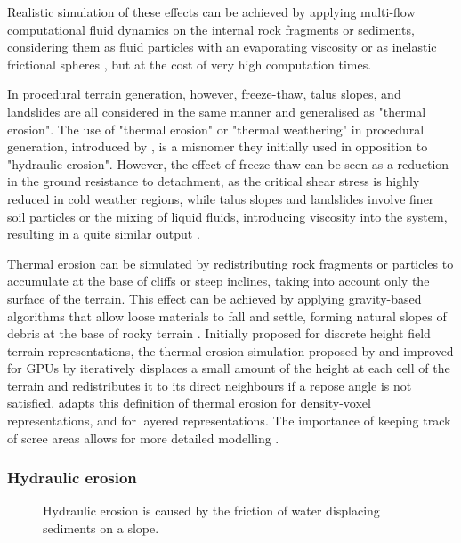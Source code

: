 \smallConclusion

Realistic simulation of these effects can be achieved by applying multi-flow computational fluid dynamics on the internal rock fragments or sediments, considering them as fluid particles with an evaporating viscosity \cite{Feng2024,Harmon2001,Lenaerts2009} or as inelastic frictional spheres \cite{Walton1993}, but at the cost of very high computation times.

In procedural terrain generation, however, freeze-thaw, talus slopes, and landslides are all considered in the same manner and generalised as "thermal erosion". The use of "thermal erosion" or "thermal weathering" in procedural generation, introduced by \cite{Musgrave1989}, is a misnomer they initially used in opposition to "hydraulic erosion". However, the effect of freeze-thaw can be seen as a reduction in the ground resistance to detachment, as the critical shear stress is highly reduced in cold weather regions, while talus slopes and landslides involve finer soil particles or the mixing of liquid fluids, introducing viscosity into the system, resulting in a quite similar output \cite{Hudak2011}.

Thermal erosion can be simulated by redistributing rock fragments or particles to accumulate at the base of cliffs or steep inclines, taking into account only the surface of the terrain. This effect can be achieved by applying gravity-based algorithms that allow loose materials to fall and settle, forming natural slopes of debris at the base of rocky terrain \cite{Musgrave1989,Jones2010}. Initially proposed for discrete height field terrain representations, the thermal erosion simulation proposed by \citep{Musgrave1989} and improved for GPUs by \cite{Jako2011} iteratively displaces a small amount of the height at each cell of the terrain and redistributes it to its direct neighbours if a repose angle is not satisfied. \citep{Jones2010} adapts this definition of thermal erosion for density-voxel representations, and \citep{Benes2001} for layered representations. The importance of keeping track of scree areas allows for more detailed modelling \cite{Peytavie2009a,Paris2020}.

\subsubsection{Hydraulic erosion}
\begin{figure}
    \centering
    \caption{Hydraulic erosion is caused by the friction of water displacing sediments on a slope.}
    \label{fig:erosion-hydraulic-erosion}
\end{figure}

